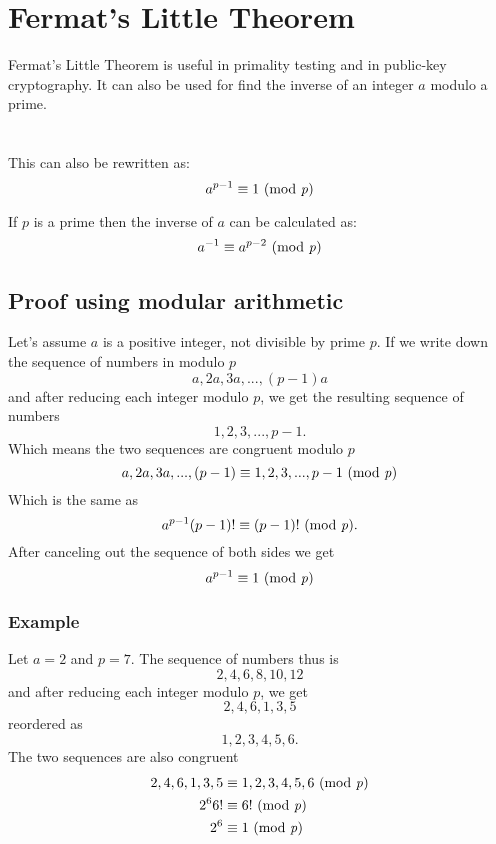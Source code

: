 \documentclass{article}
\begin{document}
	\section*{Fermat's Little Theorem} 
	Fermat's Little Theorem is useful in primality testing and in public-key cryptography. It can also be used for find the inverse of  an integer $a$ modulo a prime. \cite{fermatsummary}
	\\
	\\
	\\

	This can also be rewritten as: 
	$$
	a^{p-1} \equiv 1 \text{ (mod \textit{p})}
	$$
	
	If $p$ is a prime then the inverse of $a$ can be calculated as:
	$$
	a^{-1} \equiv a^{p-2} \text{ (mod \textit{p})}
	$$
	
 	\subsection*{Proof using modular arithmetic \cite{fermatproof}}
 	Let's assume $a$ is a positive integer, not divisible by prime $p$. If we write down the sequence of numbers in modulo $p$
 	$$
 	a,2a,3a,...,(p-1)a
 	$$
 	and after reducing each integer modulo $p$, we get the resulting sequence of numbers
 	$$
 	1,2,3,...,p-1.
 	$$
 	Which means the two sequences are congruent modulo $p$ 
 	$$
 	a,2a,3a,...,(p-1) \equiv 1,2,3,...,p-1 \text{ (mod \textit{p})}
 	$$
 	Which is the same as 
 	$$
 	a^{p-1}(p-1)! \equiv (p-1)! \text{ (mod \textit{p})}.
 	$$
 	After canceling out the sequence of both sides we get
 	$$
	a^{p-1} \equiv 1 \text{ (mod \textit{p})}
 	$$
 	
 	\subsubsection*{Example}
 	Let $a = 2$ and $ p = 7$. The sequence of numbers thus is
 	$$
 	2,4,6,8,10,12
 	$$
 	and after reducing each integer modulo $p$, we get
 	$$
 	2,4,6,1,3,5
 	$$
 	reordered as
 	$$
 	1,2,3,4,5,6.
 	$$
 	The two sequences are also congruent 
 	\[
 	\begin{split}
	 	2,4,6,1,3,5 &\equiv 1,2,3,4,5,6 \text{ (mod \textit{p})}\\
	 	2^6 6! &\equiv 6! \text{ (mod \textit{p})} \\
	 	2^6 &\equiv 1 \text{ (mod \textit{p})}
 	\end{split}
 	\]
 	
\end{document}
